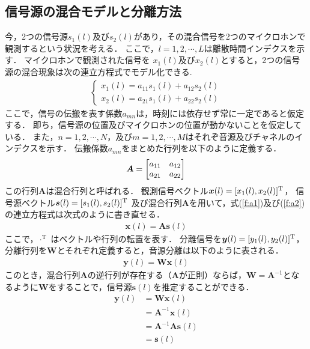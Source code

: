 \subsection{信号源の混合モデルと分離方法}
今，2つの信号源$s_1(l)$及び$s_2(l)$があり，その混合信号を2つのマイクロホンで観測するという状況を考える．
ここで，$l = 1, 2, \cdots , L$は離散時間インデクスを示す．
マイクロホンで観測された信号を
$x_1(l)$及び$x_2(l)$とすると，2つの信号源の混合現象は次の連立方程式でモデル化できる.
\begin{eqnarray}
  \begin{cases}
    x_1(l) = a_{11}s_1(l) + a_{12}s_2(l)  \label{f:a1}\\
    x_2(l) = a_{21}s_1(l) + a_{22}s_2(l)  \label{f:a2}
  \end{cases}
\end{eqnarray}
ここで，信号の伝搬を表す係数$a_{mn}$は，時刻には依存せず常に一定であると仮定する．
即ち，信号源の位置及びマイクロホンの位置が動かないことを仮定している．
また，$n = 1, 2, \cdots , N$，及び$m =
1, 2, \cdots , M $はそれぞ音源及びチャネルのインデクスを示す．
伝搬係数$a_{mn}$をまとめた行列を以下のように定義する．
\begin{align}
    \bm{A} = \textcolor{black}{\begin{bmatrix}
    a_{11}  & a_{12}  \\
    a_{21}  & a_{22}  \\
    \end{bmatrix}}
\end{align}
この行列$\bm{A}$は混合行列と呼ばれる．
観測信号ベクトル$\bm{x}(l) = \textcolor{black}{[x_1(l),x_2(l)]^\mathrm{T}}$，
信号源ベクトル$\bm{s}(l) = \textcolor{black}{[s_1(l),s_2(l)]^\mathrm{T}}$
及び混合行列$\bm{A}$を用いて，式(\ref{f:a1})及び(\ref{f:a2})の連立方程式は次式のように書き直せる．
\begin{align}
    \bm{x}(l) = \bm{A}\bm{s}(l) \label{f:x}
\end{align}
ここで，$\cdot^\mathrm{T}$ はベクトルや行列の転置を表す．
分離信号を$\bm{y}(l) = \textcolor{black}{[y_1(l),y_2(l)]^\mathrm{T}}$，分離行列を$\bm{W}$とそれぞれ定義すると，音源分離は以下のように表される．
\begin{align}
    \bm{y}(l) = \bm{W}\bm{x}(l)
\end{align}
このとき，混合行列$\bm{A}$の逆行列が存在する（$\bm{A}$が正則）ならば，$\bm{W}=\bm{A}^{-1}$となるように$\bm{W}$をすることで，信号源$\bm{s}(l)$を推定することができる．
\begin{align}
    \bm{y}(l) &= \bm{W}\bm{x}(l)\\
    &= \bm{A}^{-1}\bm{x}(l)\\
    &= \bm{A}^{-1}\bm{A}\bm{s}(l)\\
    &= \bm{s}(l)
\end{align}

